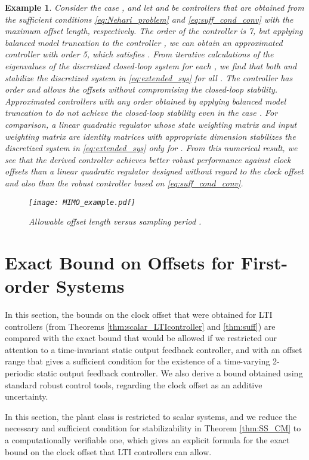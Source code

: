 \documentclass[letterpaper, 12pt, draftcls, onecolumn]{ieeeconf}
\newtheorem{example}[theorem]{Example}
\begin{document}
\begin{example}
Consider the case , and let   and  be
controllers that are obtained from the sufficient conditions 
\eqref{eq:Nehari_problem}  and  \eqref{eq:suff_cond_conv} with
the maximum offset length, respectively.
The order of the controller  
is 7, but 
applying balanced model truncation \cite[Chap.~6]{zhou1996}
to the controller ,
we can obtain
an approximated controller  with order 5,
which 
satisfies 
.
From
iterative calculations of the eigenvalues of the 
discretized closed-loop system for each ,
we find that both  and 
stabilize the discretized system  in \eqref{eq:extended_sys} 
for all .
The controller 
has order  and
allows the offsets  without compromising the closed-loop stability.
Approximated controllers with any order obtained by applying balanced 
model truncation to 
do not achieve the closed-loop stability even in the case .
For comparison, a linear quadratic regulator whose state weighting matrix  and
input weighting matrix are identity matrices with appropriate dimension stabilizes
the discretized system  in \eqref{eq:extended_sys} 
only for .
From this numerical result, we see that
the derived controller achieves better robust performance against clock offsets 
than
a linear quadratic regulator designed without regard to the clock offset and
also than the robust controller based on \eqref{eq:suff_cond_conv}.

\begin{figure}[tb]
	\centering
	\texttt{[image: MIMO\_example.pdf]}
	\caption{Allowable offset length  versus sampling period .}
	\label{fig:MIMO_ex}
\end{figure}	
\end{example}


\section{Exact Bound on Offsets for First-order Systems}
In this section, the bounds
on the clock offset
that were obtained for LTI controllers 
(from Theorems \ref{thm:scalar_LTIcontroller} 
and \ref{thm:suff}) are compared with
the exact bound that would be allowed 
if we restricted our attention to a time-invariant 
static output feedback controller, and with
an offset range that gives a sufficient condition 
for the existence of a time-varying 
2-periodic static output feedback controller.
We also derive a bound obtained using 
standard robust control tools, regarding the clock offset as an
additive uncertainty.


In this section, the plant class is restricted to scalar systems, 
and we reduce the necessary and sufficient condition for stabilizability
in Theorem \ref{thm:SS_CM} to a computationally verifiable one,
which gives an explicit formula for the exact bound on
the clock offset that LTI controllers can allow.
\end{document}
